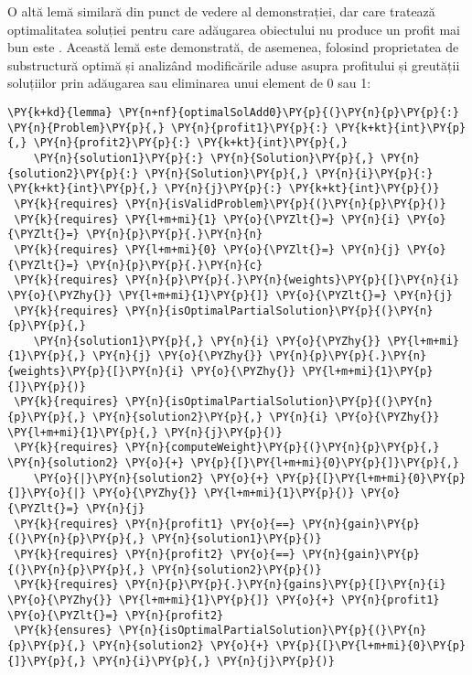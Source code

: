 \begin{sloppypar}
O altă lemă similară din punct de vedere al demonstrației, dar care tratează optimalitatea soluției pentru care adăugarea obiectului nu produce un profit mai bun este . Această lemă este demonstrată, de asemenea, folosind proprietatea de substructură optimă și analizând modificările aduse asupra profitului și greutății soluțiilor prin adăugarea sau eliminarea unui element de 0 sau 1:
\begin{Verbatim}[commandchars=\\\{\}]
\PY{k+kd}{lemma} \PY{n+nf}{optimalSolAdd0}\PY{p}{(}\PY{n}{p}\PY{p}{:} \PY{n}{Problem}\PY{p}{,} \PY{n}{profit1}\PY{p}{:} \PY{k+kt}{int}\PY{p}{,} \PY{n}{profit2}\PY{p}{:} \PY{k+kt}{int}\PY{p}{,} 
    \PY{n}{solution1}\PY{p}{:} \PY{n}{Solution}\PY{p}{,} \PY{n}{solution2}\PY{p}{:} \PY{n}{Solution}\PY{p}{,} \PY{n}{i}\PY{p}{:} \PY{k+kt}{int}\PY{p}{,} \PY{n}{j}\PY{p}{:} \PY{k+kt}{int}\PY{p}{)}
 \PY{k}{requires} \PY{n}{isValidProblem}\PY{p}{(}\PY{n}{p}\PY{p}{)}
 \PY{k}{requires} \PY{l+m+mi}{1} \PY{o}{\PYZlt{}=} \PY{n}{i} \PY{o}{\PYZlt{}=} \PY{n}{p}\PY{p}{.}\PY{n}{n}
 \PY{k}{requires} \PY{l+m+mi}{0} \PY{o}{\PYZlt{}=} \PY{n}{j} \PY{o}{\PYZlt{}=} \PY{n}{p}\PY{p}{.}\PY{n}{c}
 \PY{k}{requires} \PY{n}{p}\PY{p}{.}\PY{n}{weights}\PY{p}{[}\PY{n}{i} \PY{o}{\PYZhy{}} \PY{l+m+mi}{1}\PY{p}{]} \PY{o}{\PYZlt{}=} \PY{n}{j}
 \PY{k}{requires} \PY{n}{isOptimalPartialSolution}\PY{p}{(}\PY{n}{p}\PY{p}{,} 
    \PY{n}{solution1}\PY{p}{,} \PY{n}{i} \PY{o}{\PYZhy{}} \PY{l+m+mi}{1}\PY{p}{,} \PY{n}{j} \PY{o}{\PYZhy{}} \PY{n}{p}\PY{p}{.}\PY{n}{weights}\PY{p}{[}\PY{n}{i} \PY{o}{\PYZhy{}} \PY{l+m+mi}{1}\PY{p}{]}\PY{p}{)}
 \PY{k}{requires} \PY{n}{isOptimalPartialSolution}\PY{p}{(}\PY{n}{p}\PY{p}{,} \PY{n}{solution2}\PY{p}{,} \PY{n}{i} \PY{o}{\PYZhy{}} \PY{l+m+mi}{1}\PY{p}{,} \PY{n}{j}\PY{p}{)}
 \PY{k}{requires} \PY{n}{computeWeight}\PY{p}{(}\PY{n}{p}\PY{p}{,} \PY{n}{solution2} \PY{o}{+} \PY{p}{[}\PY{l+m+mi}{0}\PY{p}{]}\PY{p}{,} 
    \PY{o}{|}\PY{n}{solution2} \PY{o}{+} \PY{p}{[}\PY{l+m+mi}{0}\PY{p}{]}\PY{o}{|} \PY{o}{\PYZhy{}} \PY{l+m+mi}{1}\PY{p}{)} \PY{o}{\PYZlt{}=} \PY{n}{j}
 \PY{k}{requires} \PY{n}{profit1} \PY{o}{==} \PY{n}{gain}\PY{p}{(}\PY{n}{p}\PY{p}{,} \PY{n}{solution1}\PY{p}{)}
 \PY{k}{requires} \PY{n}{profit2} \PY{o}{==} \PY{n}{gain}\PY{p}{(}\PY{n}{p}\PY{p}{,} \PY{n}{solution2}\PY{p}{)}
 \PY{k}{requires} \PY{n}{p}\PY{p}{.}\PY{n}{gains}\PY{p}{[}\PY{n}{i} \PY{o}{\PYZhy{}} \PY{l+m+mi}{1}\PY{p}{]} \PY{o}{+} \PY{n}{profit1} \PY{o}{\PYZlt{}=} \PY{n}{profit2}
 \PY{k}{ensures} \PY{n}{isOptimalPartialSolution}\PY{p}{(}\PY{n}{p}\PY{p}{,} \PY{n}{solution2} \PY{o}{+} \PY{p}{[}\PY{l+m+mi}{0}\PY{p}{]}\PY{p}{,} \PY{n}{i}\PY{p}{,} \PY{n}{j}\PY{p}{)}

\end{Verbatim}
\end{sloppypar}
